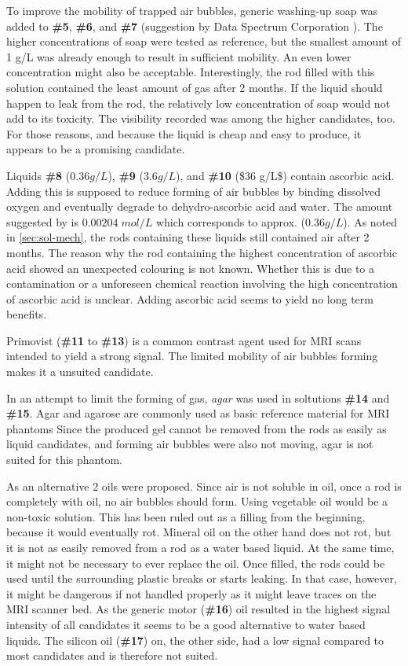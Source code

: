 To improve the mobility of trapped air bubbles, generic washing-up soap was added to \textbf{\#5}, \textbf{\#6}, and \textbf{\#7} (suggestion by Data Spectrum Corporation \cite{bubbles}).
The higher concentrations of soap were tested as reference, but the smallest amount of 1 g/L was already enough to result in sufficient mobility.
An even lower concentration might also be acceptable.
Interestingly, the rod filled with this solution contained the least amount of gas after 2 months.
If the liquid should happen to leak from the rod, the relatively low concentration of soap would not add to its toxicity.
The visibility recorded was among the higher candidates, too.
For those reasons, and because the liquid is cheap and easy to produce, it appears to be a promising candidate.

Liquids \textbf{\#8} ($0.36 g/L$), \textbf{\#9} ($3.6 g/L$), and \textbf{\#10} (\$36 g/L\$) contain ascorbic acid.
Adding this is supposed to reduce forming of air bubbles by binding dissolved oxygen and eventually degrade to dehydro-ascorbic acid and water.
The amount suggested by \cite{Abtahi2008, Bodannes1979} is $0.00204 \; mol/L$ which corresponds to approx. ($0.36 g/L$).
As noted in \ref{sec:sol-mech}, the rods containing these liquids still contained air after 2 months.
The reason why the rod containing the highest concentration of ascorbic acid showed an unexpected colouring is not known.
Whether this is due to a contamination or a unforeseen chemical reaction involving the high concentration of ascorbic acid is unclear.
Adding ascorbic acid seems to yield no long term benefits.

Primovist (\textbf{\#11} to \textbf{\#13}) is a common contrast agent used for MRI scans \cite{VanBeers2012, Rohrer, primovist} intended to yield a strong signal.
The limited mobility of air bubbles forming makes it a unsuited candidate.

In an attempt to limit the forming of gas, \textit{agar} was used in soltutions \textbf{\#14} and \textbf{\#15}.
Agar and agarose are commonly used as basic reference material for MRI phantoms \cite{BuccioliniCiraolo1989, Mathur-DeVre1985}
Since the produced gel cannot be removed from the rods as easily as liquid candidates, and forming air bubbles were also not moving, agar is not suited for this phantom.

As an alternative 2 oils were proposed.
Since air is not soluble in oil, once a rod is completely with oil, no air bubbles should form.
Using vegetable oil would be a non-toxic solution.
This has been ruled out as a filling from the beginning, because it would eventually rot.
Mineral oil on the other hand does not rot, but it is not as easily removed from a rod as a water based liquid.
At the same time, it might not be necessary to ever replace the oil.
Once filled, the rods could be used until the surrounding plastic breaks or starts leaking.
In that case, however, it might be dangerous if not handled properly as it might leave traces on the MRI scanner bed.
As the generic motor (\textbf{\#16}) oil resulted in the highest signal intensity of all candidates it seems to be a good alternative to water based liquids.
The silicon oil (\textbf{\#17}) on, the other side, had a low signal compared to most candidates and is therefore not suited.

